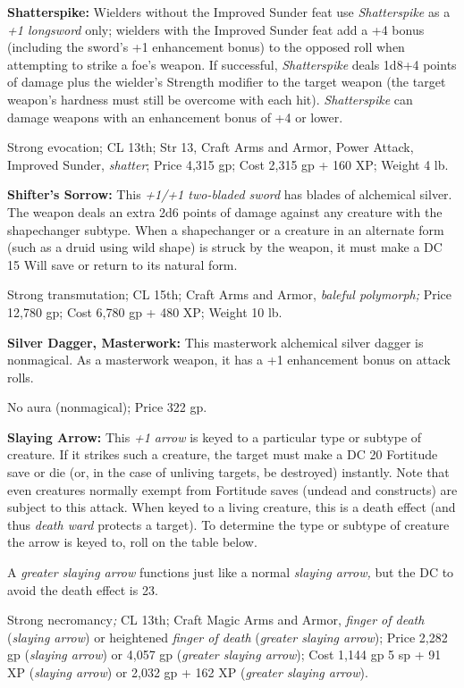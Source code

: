 \documentclass{article}
\begin{document}
\textbf{Shatterspike:} Wielders without the Improved Sunder feat use \textit{Shatterspike 
}as a \textit{+1 longsword }only; wielders with the Improved Sunder feat add a 
+4 bonus (including the sword's +1 enhancement bonus) to the opposed roll when 
attempting to strike a foe's weapon. If successful, \textit{Shatterspike }deals 
1d8+4 points of damage plus the wielder's Strength modifier to the target weapon 
(the target weapon's hardness must still be overcome with each hit). \textit{Shatterspike 
}can damage weapons with an enhancement bonus of +4 or lower.

Strong evocation; CL 13th; Str 13, Craft Arms and Armor, Power Attack, Improved 
Sunder, \textit{shatter}; Price 4,315 gp; Cost 2,315 gp + 160 XP; Weight 4 lb.

\textbf{Shifter's Sorrow:} This \textit{+1/+1 two-bladed sword }has blades of alchemical 
silver. The weapon deals an extra 2d6 points of damage against any creature with 
the shapechanger subtype. When a shapechanger or a creature in an alternate form 
(such as a druid using wild shape) is struck by the weapon, it must make a DC 15 
Will save or return to its natural form.

Strong transmutation; CL 15th; Craft Arms and Armor, \textit{baleful polymorph; 
}Price 12,780 gp; Cost 6,780 gp + 480 XP; Weight 10 lb.

\textbf{Silver Dagger, Masterwork:} This masterwork alchemical silver dagger is 
nonmagical. As a masterwork weapon, it has a +1 enhancement bonus on attack rolls.

No aura (nonmagical); Price 322 gp.

\textbf{Slaying Arrow:} This \textit{+1 arrow }is keyed to a particular type or 
subtype of creature. If it strikes such a creature, the target must make a DC 20 
Fortitude save or die (or, in the case of unliving targets, be destroyed) instantly. 
Note that even creatures normally exempt from Fortitude saves (undead and constructs) 
are subject to this attack. When keyed to a living creature, this is a death effect 
(and thus \textit{death ward }protects a target). To determine the type or subtype 
of creature the arrow is keyed to, roll on the table below.

A \textit{greater slaying arrow }functions just like a normal \textit{slaying arrow, 
}but the DC to avoid the death effect is 23.

Strong necromancy\textit{; }CL 13th; Craft Magic Arms and Armor, \textit{finger 
of death }(\textit{slaying arrow}) or heightened \textit{finger of death }(\textit{greater 
slaying arrow}); Price 2,282 gp (\textit{slaying arrow}) or 4,057 gp (\textit{greater 
slaying arrow}); Cost 1,144 gp 5 sp + 91 XP (\textit{slaying arrow}) or 2,032 gp 
+ 162 XP (\textit{greater slaying arrow}).
\end{document}
